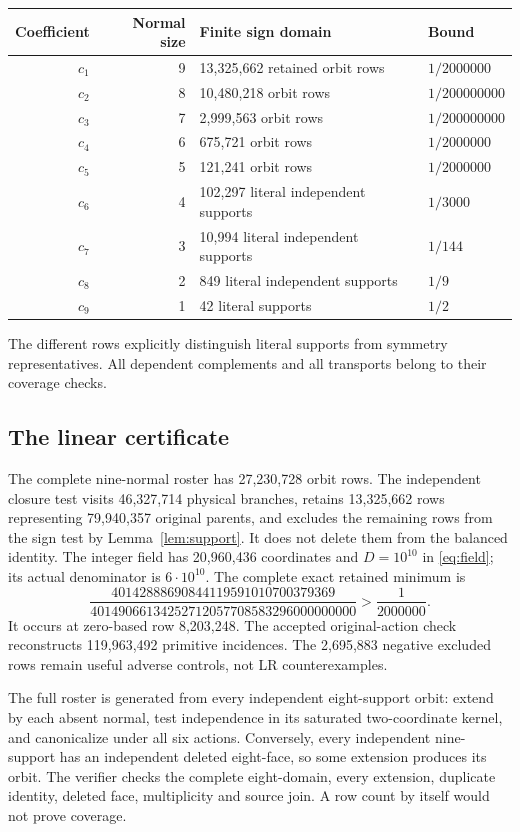 \documentclass[11pt]{article}
\theoremstyle{definition}\newtheorem{definition}[theorem]{Definition}
\theoremstyle{remark}\newtheorem{remark}[theorem]{Remark}
\begin{document}
\begin{center}
\begin{tabular}{@{}rrll@{}}\toprule
Coefficient & Normal size & Finite sign domain & Bound \\\midrule
\(c_1\)&9&13,325,662 retained orbit rows&\(1/2000000\)\\
\(c_2\)&8&10,480,218 orbit rows&\(1/200000000\)\\
\(c_3\)&7&2,999,563 orbit rows&\(1/200000000\)\\
\(c_4\)&6&675,721 orbit rows&\(1/2000000\)\\
\(c_5\)&5&121,241 orbit rows&\(1/2000000\)\\
\(c_6\)&4&102,297 literal independent supports&\(1/3000\)\\
\(c_7\)&3&10,994 literal independent supports&\(1/144\)\\
\(c_8\)&2&849 literal independent supports&\(1/9\)\\
\(c_9\)&1&42 literal supports&\(1/2\)\\\bottomrule
\end{tabular}
\end{center}
The different rows explicitly distinguish literal supports from symmetry
representatives. All dependent complements and all transports belong to
their coverage checks.

\subsection{The linear certificate}
The complete nine-normal roster has 27,230,728 orbit rows. The independent
closure test visits 46,327,714 physical branches, retains 13,325,662 rows
representing 79,940,357 original parents, and excludes the remaining rows
from the sign test by Lemma~\ref{lem:support}. It does not delete them
from the balanced identity.
The integer field has 20,960,436 coordinates and \(D=10^{10}\) in
\eqref{eq:field}; its actual denominator is \(6\cdot10^{10}\).
The complete exact retained minimum is
\[
 \frac{40142888690844119591010700379369}
 {40149066134252712057708583296000000000}
 >\frac1{2000000}.
\]
It occurs at zero-based row 8,203,248. The accepted original-action check
reconstructs 119,963,492 primitive incidences. The 2,695,883 negative
excluded rows remain useful adverse controls, not LR counterexamples.

The full roster is generated from every independent eight-support orbit:
extend by each absent normal, test independence in its saturated two-coordinate
kernel, and canonicalize under all six actions. Conversely, every independent
nine-support has an independent deleted eight-face, so some extension
produces its orbit. The verifier checks the complete eight-domain, every
extension, duplicate identity, deleted face, multiplicity and source join.
A row count by itself would not prove coverage.
\end{document}
